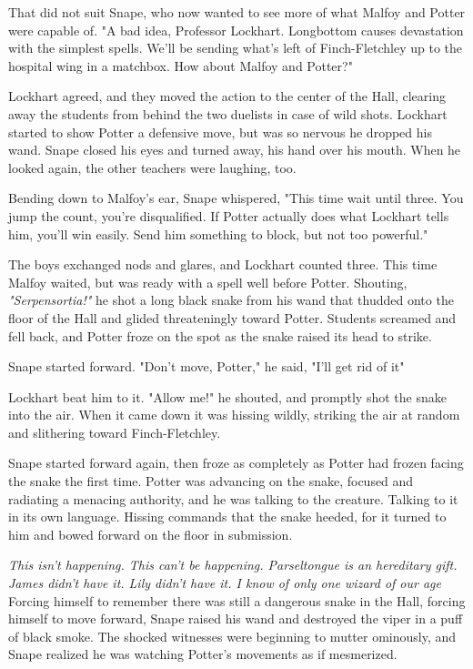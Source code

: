 That did not suit Snape, who now wanted to see more of what Malfoy and Potter were capable of. "A bad idea, Professor Lockhart. Longbottom causes devastation with the simplest spells. We'll be sending what's left of Finch-Fletchley up to the hospital wing in a matchbox. How about Malfoy and Potter?"

Lockhart agreed, and they moved the action to the center of the Hall, clearing away the students from behind the two duelists in case of wild shots. Lockhart started to show Potter a defensive move, but was so nervous he dropped his wand. Snape closed his eyes and turned away, his hand over his mouth. When he looked again, the other teachers were laughing, too.

Bending down to Malfoy's ear, Snape whispered, "This time wait until three. You jump the count, you're disqualified. If Potter actually does what Lockhart tells him, you'll win easily. Send him something to block, but not too powerful."

The boys exchanged nods and glares, and Lockhart counted three. This time Malfoy waited, but was ready with a spell well before Potter. Shouting, \emph{"Serpensortia!"} he shot a long black snake from his wand that thudded onto the floor of the Hall and glided threateningly toward Potter. Students screamed and fell back, and Potter froze on the spot as the snake raised its head to strike.

Snape started forward. "Don't move, Potter," he said, "I'll get rid of it{\el}"

Lockhart beat him to it. "Allow me!" he shouted, and promptly shot the snake into the air. When it came down it was hissing wildly, striking the air at random and slithering toward Finch-Fletchley.

Snape started forward again, then froze as completely as Potter had frozen facing the snake the first time. Potter was advancing on the snake, focused and radiating a menacing authority, and he was talking to the creature. Talking to it in its own language. Hissing commands that the snake heeded, for it turned to him and bowed forward on the floor in submission.

\emph{This isn't happening. This can't be happening. Parseltongue is an hereditary gift. James didn't have it. Lily didn't have it. I know of only one wizard of our age{\el}} Forcing himself to remember there was still a dangerous snake in the Hall, forcing himself to move forward, Snape raised his wand and destroyed the viper in a puff of black smoke. The shocked witnesses were beginning to mutter ominously, and Snape realized he was watching Potter's movements as if mesmerized.

